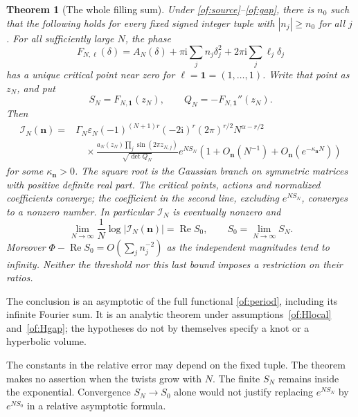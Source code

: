 \documentclass[11pt]{article}
\numberwithin{equation}{section}
\newtheorem{theorem}{Theorem}[section]
\theoremstyle{definition}\newtheorem{definition}[theorem]{Definition}
\theoremstyle{remark}\newtheorem{remark}[theorem]{Remark}
\newcommand{\ii}{\mathrm i}
\newcommand{\Rea}{\operatorname{Re}}
\begin{document}
\begin{theorem}[The whole filling sum]\label{of:main}
Under \eqref{of:source}--\eqref{of:gap}, there is $n_0$ such that the
following holds for every fixed signed integer tuple with
$|n_j|\ge n_0$ for all $j$. For all sufficiently large $N$, the phase
\begin{equation}\label{of:phase}
 F_{N,\ell}(\delta)=A_N(\delta)
            +\pi\ii\sum_j n_j\delta_j^2
            +2\pi\ii\sum_j\ell_j\delta_j
\end{equation}
has a unique critical point near zero for $\ell=\mathbf1=(1,\ldots,1)$.
Write that point as $z_N$, and put
\[
 S_N=F_{N,\mathbf1}(z_N),\qquad
 Q_N=-F_{N,\mathbf1}''(z_N).
\]
Then
\begin{equation}\label{of:asymptotic}
\begin{split}
 \mathcal I_N(\boldsymbol n)
 ={}&\Gamma_N\varepsilon_N(-1)^{(N+1)r}(-2\ii)^r
       (2\pi)^{r/2}N^{\alpha-r/2}\\
 &\quad\times\frac{a_N(z_N)\prod_j\sin(2\pi z_{N,j})}
                         {\sqrt{\det Q_N}}
       e^{NS_N}\left(1+O_{\boldsymbol n}(N^{-1})
                        +O_{\boldsymbol n}(e^{-\kappa_{\boldsymbol n}N})\right)
\end{split}
\end{equation}
for some $\kappa_{\boldsymbol n}>0$. The square root is the Gaussian
branch on symmetric matrices with positive definite real part.
The critical points, actions and normalized coefficients converge;
the coefficient in the second line, excluding $e^{NS_N}$, converges to
a nonzero number. In particular $\mathcal I_N$ is eventually nonzero and
\begin{equation}\label{of:rate}
 \lim_{N\to\infty}\frac1N\log|\mathcal I_N(\boldsymbol n)|
                         =\Rea S_0,
 \qquad S_0=\lim_{N\to\infty}S_N.
\end{equation}
Moreover $\Phi-\Rea S_0=O(\sum_j n_j^{-2})$ as the independent
magnitudes tend to infinity. Neither the threshold nor this last
bound imposes a restriction on their ratios.
\end{theorem}

The conclusion is an asymptotic of the full functional
\eqref{of:period}, including its infinite Fourier sum. It is an
analytic theorem under assumptions~\ref{of:Hlocal}
and~\ref{of:Hgap}; the hypotheses do not by themselves specify a
knot or a hyperbolic volume.

The constants in the relative error may depend on the fixed tuple.
The theorem makes no assertion when the twists grow with $N$.
The finite $S_N$ remains inside the exponential. Convergence
$S_N\to S_0$ alone would not justify replacing $e^{NS_N}$ by
$e^{NS_0}$ in a relative asymptotic formula.
\end{document}
